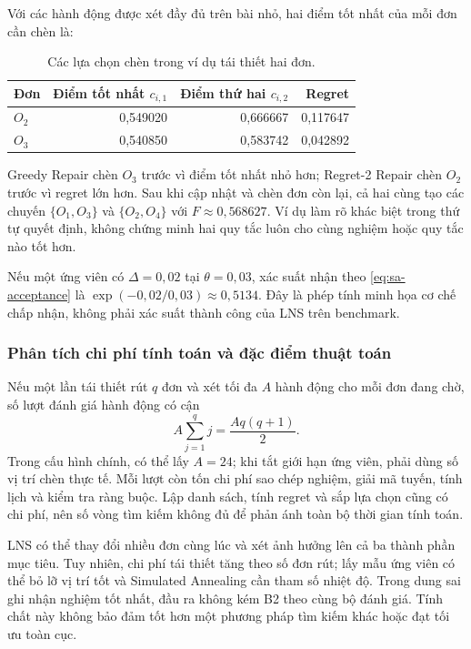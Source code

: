 Với các hành động được xét đầy đủ trên bài nhỏ, hai điểm tốt nhất của mỗi đơn cần chèn là:
\begin{table}[H]
\centering\small
\begin{tabular}{lrrr}
\toprule
Đơn & Điểm tốt nhất $c_{i,1}$ & Điểm thứ hai $c_{i,2}$ & Regret \\
\midrule
$O_2$ & 0,549020 & 0,666667 & 0,117647 \\
$O_3$ & 0,540850 & 0,583742 & 0,042892 \\
\bottomrule
\end{tabular}
\caption{Các lựa chọn chèn trong ví dụ tái thiết hai đơn.}\label{tab:repair-example}
\end{table}
Greedy Repair chèn $O_3$ trước vì điểm tốt nhất nhỏ hơn; Regret-2 Repair chèn $O_2$ trước vì regret lớn hơn. Sau khi cập nhật và chèn đơn còn lại, cả hai cùng tạo các chuyến $\{O_1,O_3\}$ và $\{O_2,O_4\}$ với $F\approx0{,}568627$. Ví dụ làm rõ khác biệt trong thứ tự quyết định, không chứng minh hai quy tắc luôn cho cùng nghiệm hoặc quy tắc nào tốt hơn.

Nếu một ứng viên có $\Delta=0{,}02$ tại $\theta=0{,}03$, xác suất nhận theo \eqref{eq:sa-acceptance} là $\exp(-0{,}02/0{,}03)\approx0{,}5134$. Đây là phép tính minh họa cơ chế chấp nhận, không phải xác suất thành công của LNS trên benchmark.

\subsubsection{Phân tích chi phí tính toán và đặc điểm thuật toán}
Nếu một lần tái thiết rút $q$ đơn và xét tối đa $A$ hành động cho mỗi đơn đang chờ, số lượt đánh giá hành động có cận
\begin{equation}
 A\sum_{j=1}^{q}j=\frac{Aq(q+1)}2.\label{eq:repair-evaluation-bound}
\end{equation}
Trong cấu hình chính, có thể lấy $A=24$; khi tắt giới hạn ứng viên, phải dùng số vị trí chèn thực tế. Mỗi lượt còn tốn chi phí sao chép nghiệm, giải mã tuyến, tính lịch và kiểm tra ràng buộc. Lập danh sách, tính regret và sắp lựa chọn cũng có chi phí, nên số vòng tìm kiếm không đủ để phản ánh toàn bộ thời gian tính toán.

LNS có thể thay đổi nhiều đơn cùng lúc và xét ảnh hưởng lên cả ba thành phần mục tiêu. Tuy nhiên, chi phí tái thiết tăng theo số đơn rút; lấy mẫu ứng viên có thể bỏ lỡ vị trí tốt và Simulated Annealing cần tham số nhiệt độ. Trong dung sai ghi nhận nghiệm tốt nhất, đầu ra không kém B2 theo cùng bộ đánh giá. Tính chất này không bảo đảm tốt hơn một phương pháp tìm kiếm khác hoặc đạt tối ưu toàn cục.

